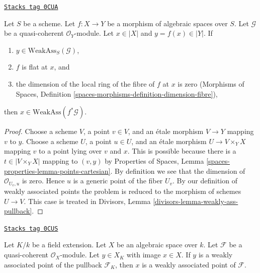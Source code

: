 \begin{lemma}
\label{spaces-divisors-lemma-weakly-ass-pullback}
\href{https://stacks.math.columbia.edu/tag/0CUA}{\texttt{Stacks tag 0CUA}}

Let $S$ be a scheme. Let $f : X \to Y$ be a morphism of algebraic spaces
over $S$. Let $\mathcal{G}$ be a quasi-coherent $\mathcal{O}_Y$-module.
Let $x \in |X|$ and $y = f(x) \in |Y|$. If
\begin{enumerate}
\item $y \in \text{WeakAss}_S(\mathcal{G})$,
\item $f$ is flat at $x$, and
\item the dimension of the local ring of the fibre of $f$ at $x$
is zero (Morphisms of Spaces, Definition
\ref{spaces-morphisms-definition-dimension-fibre}),
\end{enumerate}
then $x \in \text{WeakAss}(f^*\mathcal{G})$.
\end{lemma}

\begin{proof}
Choose a scheme $V$, a point $v \in V$, and an \'etale morphism $V \to Y$
mapping $v$ to $y$. Choose a scheme $U$, a point $u \in U$, and an
\'etale morphism $U \to V \times_Y X$ mapping $v$ to a point lying over
$v$ and $x$. This is possible because there is a $t \in |V \times_Y X|$
mapping to $(v, y)$ by Properties of Spaces, Lemma
\ref{spaces-properties-lemma-points-cartesian}.
By definition we see that the dimension of $\mathcal{O}_{U_v, u}$ is zero.
Hence $u$ is a generic point of the fiber $U_v$.
By our definition of weakly associated points
the problem is reduced to the morphism of schemes $U \to V$.
This case is treated in
Divisors, Lemma \ref{divisors-lemma-weakly-ass-pullback}.
\end{proof}

\begin{lemma}
\label{spaces-divisors-lemma-weakly-ass-change-fields}
\href{https://stacks.math.columbia.edu/tag/0CUS}{\texttt{Stacks tag 0CUS}}

Let $K/k$ be a field extension. Let $X$ be an algebraic space over $k$.
Let $\mathcal{F}$ be a quasi-coherent $\mathcal{O}_X$-module.
Let $y \in X_K$ with image $x \in X$. If $y$ is a weakly
associated point of the pullback $\mathcal{F}_K$, then $x$
is a weakly associated point of $\mathcal{F}$.
\end{lemma}

